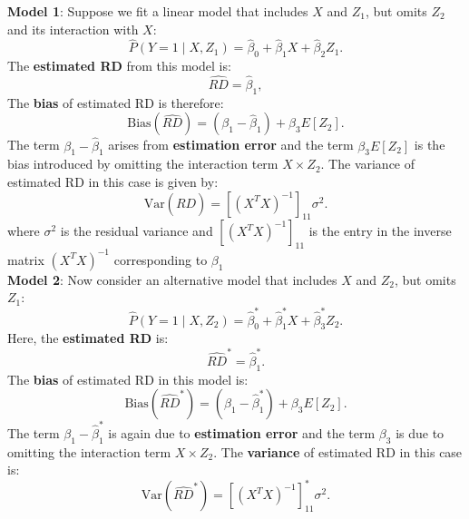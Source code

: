 \documentclass[12pt,oneside]{amsart}
\theoremstyle{definition}
\theoremstyle{remark}
\numberwithin{equation}{section}
\begin{document}
\textbf{Model 1}: Suppose we fit a linear model that includes \( X \) and \( Z_1 \), but omits \( Z_2 \) and its interaction with \( X \):
\begin{equation}
    \hat{P}(Y = 1 \mid X, Z_1) = \hat{\beta}_0 + \hat{\beta}_1 X + \hat{\beta}_2 Z_1.
\end{equation}
The \textbf{estimated RD} from this model is:
\begin{equation}
    \hat{RD} = \hat{\beta}_1,
\end{equation}
The \textbf{bias} of estimated RD is therefore:
\begin{equation}
    \text{Bias}(\hat{RD}) = (\beta_1 - \hat{\beta}_1) + \beta_3 E[Z_2].
\end{equation}
The term \( \beta_1 - \hat{\beta}_1 \) arises from \textbf{estimation error} and the term \( \beta_3 E[Z_2] \) is the bias introduced by omitting the interaction term \( X \times Z_2 \). The variance of estimated RD in this case is given by:
\begin{equation}
    \text{Var}(\hat{RD}) = \left[(X^T X)^{-1}\right]_{11} \sigma^2.
\end{equation}
where \( \sigma^2 \) is the residual variance and $\left[(X^T X)^{-1}\right]_{11}$ is the entry in the inverse matrix \( (X^T X)^{-1} \) corresponding to \( \beta_1 \)
\\

\textbf{Model 2}: Now consider an alternative model that includes \( X \) and \( Z_2 \), but omits \( Z_1 \):
\begin{equation}
    \hat{P}(Y = 1 \mid X, Z_2) = \hat{\beta}_0^* + \hat{\beta}_1^* X + \hat{\beta}_3^* Z_2.
\end{equation}
Here, the \textbf{estimated RD} is:
\begin{equation}
    \hat{RD}^* = \hat{\beta}_1^*.
\end{equation}
The \textbf{bias} of estimated RD in this model is:
\begin{equation}
    \text{Bias}(\hat{RD}^*) = (\beta_1 - \hat{\beta}_1^*) + \beta_3 E[Z_2].
\end{equation}
The term \( \beta_1 - \hat{\beta}_1^* \) is again due to \textbf{estimation error} and the term \( \beta_3 \) is due to omitting the interaction term \( X \times Z_2 \). The \textbf{variance} of estimated RD in this case is:
\begin{equation}
    \text{Var}(\hat{RD}^*) = \left[(X^T X)^{-1}\right]_{11}^* \sigma^2.
\end{equation}
\end{document}
